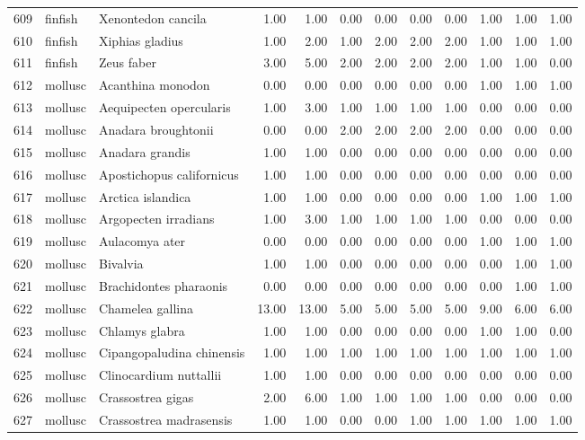 \begin{table}[ht]
\begin{tabular}{rllrrrrrrrrr}
  609 & finfish & Xenontedon cancila & 1.00 & 1.00 & 0.00 & 0.00 & 0.00 & 0.00 & 1.00 & 1.00 & 1.00 \\ 
  610 & finfish & Xiphias gladius & 1.00 & 2.00 & 1.00 & 2.00 & 2.00 & 2.00 & 1.00 & 1.00 & 1.00 \\ 
  611 & finfish & Zeus faber & 3.00 & 5.00 & 2.00 & 2.00 & 2.00 & 2.00 & 1.00 & 1.00 & 0.00 \\ 
  612 & mollusc & Acanthina monodon & 0.00 & 0.00 & 0.00 & 0.00 & 0.00 & 0.00 & 1.00 & 1.00 & 1.00 \\ 
  613 & mollusc & Aequipecten opercularis & 1.00 & 3.00 & 1.00 & 1.00 & 1.00 & 1.00 & 0.00 & 0.00 & 0.00 \\ 
  614 & mollusc & Anadara broughtonii & 0.00 & 0.00 & 2.00 & 2.00 & 2.00 & 2.00 & 0.00 & 0.00 & 0.00 \\ 
  615 & mollusc & Anadara grandis & 1.00 & 1.00 & 0.00 & 0.00 & 0.00 & 0.00 & 0.00 & 0.00 & 0.00 \\ 
  616 & mollusc & Apostichopus californicus & 1.00 & 1.00 & 0.00 & 0.00 & 0.00 & 0.00 & 0.00 & 0.00 & 0.00 \\ 
  617 & mollusc & Arctica islandica & 1.00 & 1.00 & 0.00 & 0.00 & 0.00 & 0.00 & 1.00 & 1.00 & 1.00 \\ 
  618 & mollusc & Argopecten irradians & 1.00 & 3.00 & 1.00 & 1.00 & 1.00 & 1.00 & 0.00 & 0.00 & 0.00 \\ 
  619 & mollusc & Aulacomya ater & 0.00 & 0.00 & 0.00 & 0.00 & 0.00 & 0.00 & 1.00 & 1.00 & 1.00 \\ 
  620 & mollusc & Bivalvia & 1.00 & 1.00 & 0.00 & 0.00 & 0.00 & 0.00 & 0.00 & 1.00 & 1.00 \\ 
  621 & mollusc & Brachidontes pharaonis & 0.00 & 0.00 & 0.00 & 0.00 & 0.00 & 0.00 & 0.00 & 1.00 & 1.00 \\ 
  622 & mollusc & Chamelea gallina & 13.00 & 13.00 & 5.00 & 5.00 & 5.00 & 5.00 & 9.00 & 6.00 & 6.00 \\ 
  623 & mollusc & Chlamys glabra & 1.00 & 1.00 & 0.00 & 0.00 & 0.00 & 0.00 & 1.00 & 1.00 & 0.00 \\ 
  624 & mollusc & Cipangopaludina chinensis & 1.00 & 1.00 & 1.00 & 1.00 & 1.00 & 1.00 & 1.00 & 1.00 & 1.00 \\ 
  625 & mollusc & Clinocardium nuttallii & 1.00 & 1.00 & 0.00 & 0.00 & 0.00 & 0.00 & 0.00 & 0.00 & 0.00 \\ 
  626 & mollusc & Crassostrea gigas & 2.00 & 6.00 & 1.00 & 1.00 & 1.00 & 1.00 & 0.00 & 0.00 & 0.00 \\ 
  627 & mollusc & Crassostrea madrasensis & 1.00 & 1.00 & 0.00 & 0.00 & 1.00 & 1.00 & 1.00 & 1.00 & 1.00 \\ 

\end{tabular}
\end{table}
